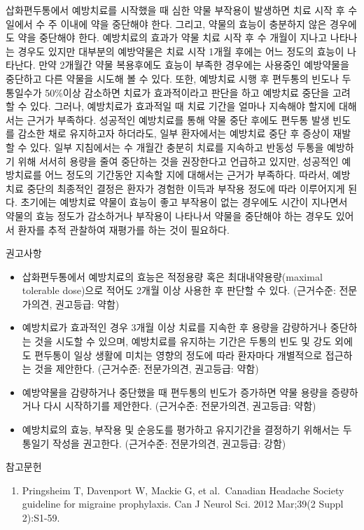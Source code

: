 \documentclass[]{book}
\providecommand{\tightlist}{%
  \setlength{\itemsep}{0pt}\setlength{\parskip}{0pt}}
\begin{document}
삽화편두통에서 예방치료를 시작했을 때 심한 약물 부작용이 발생하면 치료 시작 후 수 일에서 수 주 이내에 약을 중단해야 한다. 그리고, 약물의 효능이 충분하지 않은 경우에도 약을 중단해야 한다. 예방치료의 효과가 약물 치료 시작 후 수 개월이 지나고 나타나는 경우도 있지만 대부분의 예방약물은 치료 시작 1개월 후에는 어느 정도의 효능이 나타난다. 만약 2개월간 약물 복용후에도 효능이 부족한 경우에는 사용중인 예방약물을 중단하고 다른 약물을 시도해 볼 수 있다. 또한, 예방치료 시행 후 편두통의 빈도나 두통일수가 50\%이상 감소하면 치료가 효과적이라고 판단을 하고 예방치료 중단을 고려할 수 있다. 그러나, 예방치료가 효과적일 때 치료 기간을 얼마나 지속해야 할지에 대해서는 근거가 부족하다. 성공적인 예방치료를 통해 약물 중단 후에도 편두통 발생 빈도를 감소한 채로 유지하고자 하더라도, 일부 환자에서는 예방치료 중단 후 증상이 재발할 수 있다. 일부 지침에서는 수 개월간 충분히 치료를 지속하고 반동성 두통을 예방하기 위해 서서히 용량을 줄여 중단하는 것을 권장한다고 언급하고 있지만, 성공적인 예방치료를 어느 정도의 기간동안 지속할 지에 대해서는 근거가 부족하다. 따라서, 예방치료 중단의 최종적인 결정은 환자가 경험한 이득과 부작용 정도에 따라 이루어지게 된다. 초기에는 예방치료 약물이 효능이 좋고 부작용이 없는 경우에도 시간이 지나면서 약물의 효능 정도가 감소하거나 부작용이 나타나서 약물을 중단해야 하는 경우도 있어서 환자를 추적 관찰하여 재평가를 하는 것이 필요하다.

권고사항

\begin{itemize}
\item
  삽화편두통에서 예방치료의 효능은 적정용량 혹은 최대내약용량(maximal tolerable dose)으로 적어도 2개월 이상 사용한 후 판단할 수 있다. (근거수준: 전문가의견, 권고등급: 약함)
\item
  예방치료가 효과적인 경우 3개월 이상 치료를 지속한 후 용량을 감량하거나 중단하는 것을 시도할 수 있으며, 예방치료를 유지하는 기간은 두통의 빈도 및 강도 외에도 편두통이 일상 생활에 미치는 영향의 정도에 따라 환자마다 개별적으로 접근하는 것을 제안한다. (근거수준: 전문가의견, 권고등급: 약함)
\item
  예방약물을 감량하거나 중단했을 때 편두통의 빈도가 증가하면 약물 용량을 증량하거나 다시 시작하기를 제안한다. (근거수준: 전문가의견, 권고등급: 약함)
\item
  예방치료의 효능, 부작용 및 순응도를 평가하고 유지기간을 결정하기 위해서는 두통일기 작성을 권고한다. (근거수준: 전문가의견, 권고등급: 강함)
\end{itemize}

참고문헌

\begin{enumerate}
\def\labelenumi{\arabic{enumi}.}
\tightlist
\item
  Pringsheim T, Davenport W, Mackie G, et al.~Canadian Headache Society guideline for migraine prophylaxis. Can J Neurol Sci. 2012 Mar;39(2 Suppl 2):S1-59.
\end{enumerate}
\end{document}
